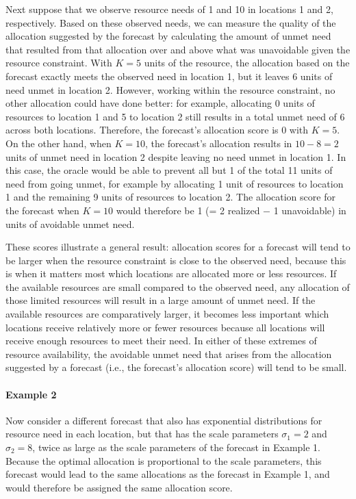 \documentclass{article}\usepackage[]{graphicx}\usepackage[]{xcolor}
\begin{document}
Next suppose that we observe resource needs of 1 and 10 in locations 1 and 2, respectively.
Based on these observed needs, we can measure the quality of the allocation suggested by the forecast by calculating the amount of unmet need that resulted from that allocation over and above what was unavoidable given the resource constraint.
With $K = 5$ units of the resource, the allocation based on the forecast exactly meets the observed need in location 1, but it leaves 6 units of need unmet in location 2.
However, working within the resource constraint, no other allocation could have done better: for example, allocating 0 units of resources to location 1 and 5 to location 2 still results in a total unmet need of 6 across both locations. Therefore, the forecast's allocation score is 0 with $K = 5$.
On the other hand, when $K = 10$, the forecast's allocation results in $10 - 8 = 2$ units of unmet need in location 2 despite leaving no need unmet in location 1.
In this case, the oracle would be able to prevent all but 1 of the total 11 units of need from going unmet, for example by allocating 1 unit of resources to location 1 and the remaining 9 units of resources to location 2.
The allocation score for the forecast when $K = 10$ would therefore be 1 (= 2 realized $-$ 1 unavoidable) in units of avoidable unmet need.

These scores illustrate a general result: allocation scores for a forecast will tend to be larger when the resource constraint is close to the observed need, because this is when it matters most which locations are allocated more or less resources. If the available resources are small compared to the observed need, any allocation of those limited resources will result in a large amount of unmet need. If the available resources are comparatively larger, it becomes less important which locations receive relatively more or fewer resources because all locations will receive enough resources to meet their need. In either of these extremes of resource availability, the avoidable unmet need that arises from the allocation suggested by a forecast (i.e., the forecast's allocation score) will tend to be small.

\paragraph{Example 2} Now consider a different forecast that also has exponential distributions for resource need in each location, but that has the scale parameters $\sigma_1 = 2$ and $\sigma_2 = 8$, twice as large as the scale parameters of the forecast in Example 1. Because the optimal allocation is proportional to the scale parameters, this forecast would lead to the same allocations as the forecast in Example 1, and would therefore be assigned the same allocation score.
\end{document}
